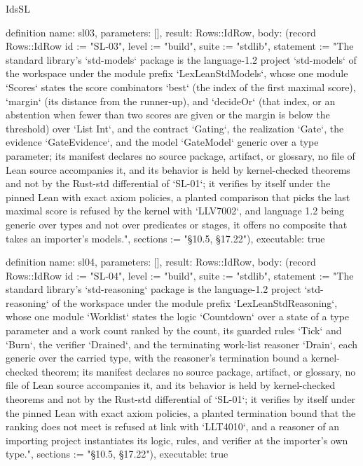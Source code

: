\begin{lexlean}{IdsSL}
\begin{semanticmodule}
definition{
  name: sl03,
  parameters: [],
  result: Rows::IdRow,
  body: (record Rows::IdRow {id := "SL-03", level := "build", suite := "stdlib", statement := "The standard library's `std-models` package is the language-1.2 project `std-models` of the workspace under the module prefix `LexLeanStdModels`, whose one module `Scores` states the score combinators `best` (the index of the first maximal score), `margin` (its distance from the runner-up), and `decideOr` (that index, or an abstention when fewer than two scores are given or the margin is below the threshold) over `List Int`, and the contract `Gating`, the realization `Gate`, the evidence `GateEvidence`, and the model `GateModel` generic over a type parameter; its manifest declares no source package, artifact, or glossary, no file of Lean source accompanies it, and its behavior is held by kernel-checked theorems and not by the Rust-std differential of `SL-01`; it verifies by itself under the pinned Lean with exact axiom policies, a planted comparison that picks the last maximal score is refused by the kernel with `LLV7002`, and language 1.2 being generic over types and not over predicates or stages, it offers no composite that takes an importer's models.", sections := "§10.5, §17.22"}),
  executable: true
}

definition{
  name: sl04,
  parameters: [],
  result: Rows::IdRow,
  body: (record Rows::IdRow {id := "SL-04", level := "build", suite := "stdlib", statement := "The standard library's `std-reasoning` package is the language-1.2 project `std-reasoning` of the workspace under the module prefix `LexLeanStdReasoning`, whose one module `Worklist` states the logic `Countdown` over a state of a type parameter and a work count ranked by the count, its guarded rules `Tick` and `Burn`, the verifier `Drained`, and the terminating work-list reasoner `Drain`, each generic over the carried type, with the reasoner's termination bound a kernel-checked theorem; its manifest declares no source package, artifact, or glossary, no file of Lean source accompanies it, and its behavior is held by kernel-checked theorems and not by the Rust-std differential of `SL-01`; it verifies by itself under the pinned Lean with exact axiom policies, a planted termination bound that the ranking does not meet is refused at link with `LLT4010`, and a reasoner of an importing project instantiates its logic, rules, and verifier at the importer's own type.", sections := "§10.5, §17.22"}),
  executable: true
}


\end{semanticmodule}
\end{lexlean}
